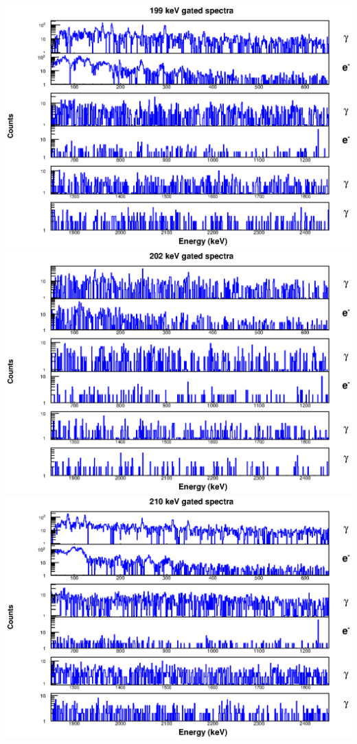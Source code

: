\begin{landscape}
\includegraphics[scale=1.1]{154Gd_Appendix/199_combined.eps}
\includegraphics[scale=1.1]{154Gd_Appendix/202_combined.eps}
\includegraphics[scale=1.1]{154Gd_Appendix/210_combined.eps}

\end{landscape}

